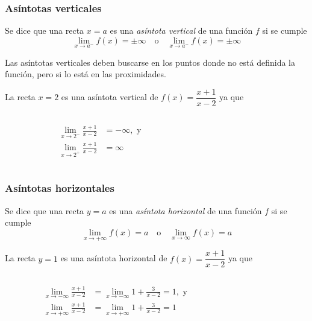\begin{frame}
\frametitle{Asíntotas verticales}
\begin{definicion}
Se dice que una recta $x=a$ es una \emph{asíntota vertical} de una función $f$ si se cumple
\[ \lim_{x\rightarrow a^-}f(x)=\pm \infty \quad \textrm{o} \quad \lim_{x\rightarrow a^-}f(x)=\pm \infty \]
\end{definicion}

Las asíntotas verticales deben buscarse en los puntos donde no está definida la función, pero si lo está en las proximidades.

 La recta $x=2$ es una asíntota vertical de $f(x)=\dfrac{x+1}{x-2}$ ya que
\begin{columns}
\begin{column}{0.3\textwidth}
\begin{align*}
\lim_{x\rightarrow 2^-}\frac{x+1}{x-2}&=-\infty, \textrm{ y}\\
\lim_{x\rightarrow 2^+}\frac{x+1}{x-2}&=\infty
\end{align*}
\end{column}
\begin{column}{0.4\textwidth}
\begin{center}
\scalebox{1}{}
\end{center}
\end{column}
\end{columns}
\end{frame}


\begin{frame}
\frametitle{Asíntotas horizontales}
\begin{definicion}
Se dice que una recta $y=a$ es una \emph{asíntota horizontal} de una función $f$ si se cumple
\[ \lim_{x\rightarrow +\infty}f(x)=a \quad \textrm{o} \quad \lim_{x\rightarrow \infty}f(x)=a \]
\end{definicion}

 La recta $y=1$ es una asíntota horizontal de $f(x)=\dfrac{x+1}{x-2}$ ya que
\begin{columns}
\begin{column}{0.5\textwidth}
\begin{align*}
\lim_{x\rightarrow -\infty}\frac{x+1}{x-2}&= \lim_{x\rightarrow -\infty}1+\frac{3}{x-2} = 1, \textrm{ y}\\
\lim_{x\rightarrow +\infty}\frac{x+1}{x-2}&= \lim_{x\rightarrow +\infty}1+\frac{3}{x-2} = 1
\end{align*}
\end{column}
\begin{column}{0.5\textwidth}
\begin{center}
\scalebox{1}{}
\end{center}
\end{column}
\end{columns}
\end{frame}


